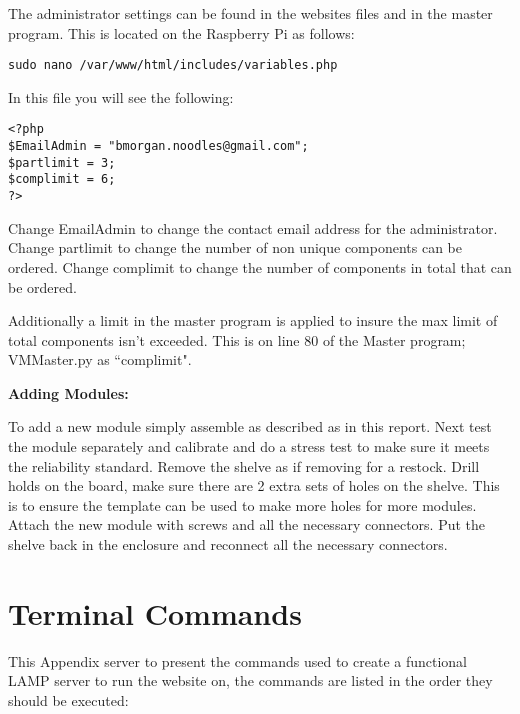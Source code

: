 \documentclass[a4paper,11pt]{article}
\numberwithin{figure}{section}
\numberwithin{table}{section}
\begin{document}
\begin{appendices}
The administrator settings can be found in the websites files and in the master program. This is located on the Raspberry Pi as follows:
\begin{lstlisting}
sudo nano /var/www/html/includes/variables.php
\end{lstlisting}
In this file you will see the following:
\begin{lstlisting}
<?php
$EmailAdmin = "bmorgan.noodles@gmail.com";
$partlimit = 3;
$complimit = 6;
?>
\end{lstlisting}
Change EmailAdmin to change the contact email address for the administrator. Change partlimit to change the number of non unique components can be ordered. Change complimit to change the number of components in total that can be ordered.

Additionally a limit in the master program is applied to insure the max limit of total components isn't exceeded. This is on line 80 of the Master program; VMMaster.py as ``complimit".

\textbf{Adding Modules:}

To add a new module simply assemble as described as in this report. Next test the module separately and calibrate and do a stress test to make sure it meets the reliability standard. Remove the shelve as if removing for a restock. Drill holds on the board, make sure there are 2 extra sets of holes on the shelve. This is to ensure the template can be used to make more holes for more modules. Attach the new module with screws and all the necessary connectors. Put the shelve back in the enclosure and reconnect all the necessary connectors.
\newpage

\section{Terminal Commands}\thispagestyle{sectionstart}
\label{sec:PiCommands}

This Appendix server to present the commands used to create a functional LAMP server to run the website on, the commands are listed in the order they should be executed:


\end{appendices}
\end{document}
